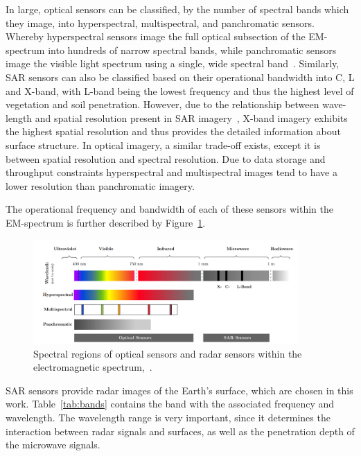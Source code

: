 In large, optical sensors can be classified, by the number of spectral bands which they image, into hyperspectral, multispectral, and panchromatic sensors. 
Whereby hyperspectral sensors image the full optical subsection of the EM-spectrum into hundreds of narrow spectral bands, while panchromatic sensors image the visible light spectrum using a single, wide spectral band~\citep{Sara2021}.
Similarly, SAR sensors can also be classified based on their operational bandwidth into C, L and X-band, with L-band being the lowest frequency and thus the highest level of vegetation and soil penetration.
However, due to the relationship between wave-length and spatial resolution present in SAR imagery~\citep{cumming2005digital}, X-band imagery exhibits the highest spatial resolution and thus provides the detailed information about surface structure. 
In optical imagery, a similar trade-off exists, except it is between spatial resolution and spectral resolution. 
Due to data storage and throughput constraints hyperspectral and multispectral images tend to have a lower resolution than panchromatic imagery.

The operational frequency and bandwidth of each of these sensors within the EM-spectrum is further described by Figure~\ref{fig:EM-spectrum}.
	\begin{figure}[H]
    \centering
    \includegraphics[width=0.9\textwidth]{../../Images/PNG/sensor.png}
    \caption[Spectral regions of sensors within the electromagnetic spectrum.]{Spectral regions of optical sensors and radar sensors within the electromagnetic spectrum,~\citep{zhang2022synthetic}.}
    \label{fig:EM-spectrum}
\end{figure}
SAR sensors provide radar images of the Earth’s surface, which are chosen in this work.
Table~\ref{tab:bands} contains the band with the associated frequency and wavelength. 
The wavelength range is very important, since it determines the interaction between radar signals and surfaces, as well as the penetration depth of the microwave
signals.



